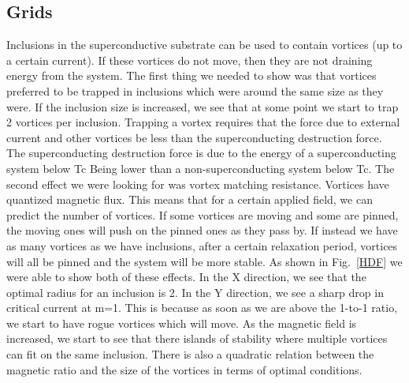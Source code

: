 \subsection{Grids}
Inclusions in the superconductive substrate can be used to contain vortices (up to a certain current). If these vortices do not move, then they are not draining energy from the system. The first thing we needed to show was that vortices preferred to be trapped in inclusions which were around the same size as they were. If the inclusion size is increased, we see that at some point we start to trap 2 vortices per inclusion. Trapping a vortex requires that the force due to external current and other vortices be less than the superconducting destruction force. The superconducting destruction force is due to the energy of a superconducting system below Tc Being lower than a non-superconducting system below Tc. The second effect we were looking for was vortex matching resistance. Vortices have quantized magnetic flux. This means that for a certain applied field, we can predict the number of vortices. If some vortices are moving and some are pinned, the moving ones will push on the pinned ones as they pass by. If instead we have as many vortices as we have inclusions, after a certain relaxation period, vortices will all be pinned and the system will be more stable. As shown in Fig.~\ref{HDF} we were able to show both of these effects. In the X direction, we see that the optimal radius for an inclusion is 2. In the Y direction, we see a sharp drop in critical current at m=1. This is because as soon as we are above the 1-to-1 ratio, we start to have rogue vortices which will move. As the magnetic field is increased, we start to see that there islands of stability where multiple vortices can fit on the same inclusion. There is also a quadratic relation between the magnetic ratio and the size of the vortices in terms of optimal conditions.

